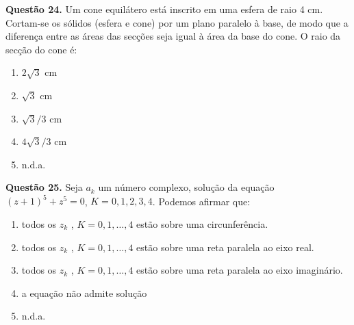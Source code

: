 \documentclass[11pt]{article}
\begin{document}
\textbf{Questão 24.} Um  cone  equilátero  está  inscrito  em  uma  esfera  de  raio  4  cm.  Cortam-se  os  sólidos  (esfera  e  cone)  por  um  plano  paralelo  à  base,  de  modo  que  a  diferença  entre  as  áreas das secções seja igual à área da base do cone. O raio da secção do cone é: 

\begin{multicols}{3}
    \begin{enumerate}[\bf A (\quad)]
        \item $2\sqrt{3}$ cm
        \item $\sqrt{3}$ cm
        \item $\sqrt{3} / 3$ cm
        \item $4\sqrt{3} / 3$ cm
        \item n.d.a.
    \end{enumerate}
\end{multicols}

\textbf{Questão 25.} Seja  $a_k$  um  número  complexo,  solução  da  equação $(z + 1)^5 + z^5 = 0$,  $K  =  0,  1,  2,  3,  4$.  Podemos  afirmar  que: 


\begin{enumerate}[\bf A (\quad)]
    \item todos   os   $z_k$   ,   $K   =   0,   1, \dots,   4$   estão   sobre   uma   circunferência.
    \item todos  os  $z_k$  ,  $K  =  0,  1, \dots,  4$  estão  sobre  uma  reta  paralela ao eixo real. 
    \item todos  os  $z_k$  ,  $K  =  0,  1, \dots,  4$  estão  sobre  uma  reta  paralela ao eixo imaginário. 
    \item a equação não admite solução
    \item n.d.a.
\end{enumerate}
\end{document}
